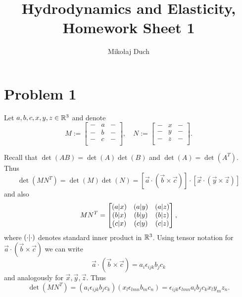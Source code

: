 \documentclass[10pt]{article}
\title{Hydrodynamics and Elasticity,\\ Homework Sheet 1}
\author{Mikołaj Duch}
\begin{document}
    \maketitle
    \section*{Problem 1}

    Let $a,b,c,x,y,z \in \mathbb{R}^3$ and denote
    \begin{displaymath}
      M := \begin{bmatrix}
        - & a & - \\
        - & b & - \\
        - & c & - \\
      \end{bmatrix}, 
      \quad
      N := \begin{bmatrix}
        - & x & - \\
        - & y & - \\
        - & z & - \\
      \end{bmatrix}.
    \end{displaymath}
    
    Recall that $\det (A B) = \det (A) \det (B)$ and $\det(A) = \det (A^T)$.
    Thus
    \begin{displaymath}
      \det (M N^T) = \det (M) \det (N) = \left[ \vec a \cdot (\vec b \times \vec c) \right] \cdot 
      \left[ \vec x \cdot (\vec y \times \vec z) \right]
    \end{displaymath}
    and also
    \begin{equation}
      M N^T = \begin{bmatrix}
        \left(a|x\right) & \left(a|y\right) & \left(a|z\right) \\
        \left(b|x\right) & \left(b|y\right) & \left(b|z\right) \\
        \left(c|x\right) & \left(c|y\right) & \left(c|z\right) 
      \end{bmatrix},
      \label{matrixform}
    \end{equation}
    where $\left(\cdot|\cdot\right)$ denotes standard inner product in $\mathbb{R}^3$.
    Using tensor notation for $\vec a \cdot (\vec b \times \vec c)$ we can write 
    \begin{displaymath}
      \vec a \cdot (\vec b \times \vec c) =  a_i \epsilon_{ijk}b_j c_k
    \end{displaymath}
    and analogously for $\vec x, \vec y, \vec z$. Thus
    \begin{displaymath}
      \det (MN^T) = (a_i \epsilon_{ijk} b_j c_k) (x_l \epsilon_{lmn} b_m c_n) = \epsilon_{ijk} \epsilon_{lmn} a_i b_j c_k x_l y_m z_n.
    \end{displaymath}
    
\end{document}
